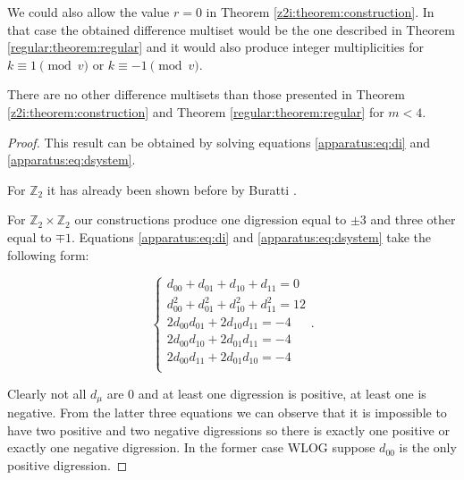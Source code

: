 \begin{remark}
    We could also allow the value $r=0$ in Theorem \ref{z2i:theorem:construction}. In that case the obtained difference multiset would be the one described in 
Theorem \ref{regular:theorem:regular} and it would also produce  integer multiplicities for $k \equiv 1 \pmod v$ or $k \equiv -1 \pmod v$.
\end{remark}

\begin{theorem}
	\label{z2i:theorem:exclusive}
    There are no other difference multisets than those presented in Theorem \ref{z2i:theorem:construction} and Theorem \ref{regular:theorem:regular} for $m < 4$.
\end{theorem}

\begin{proof}
    This result can be obtained by solving equations \eqref{apparatus:eq:di} and \eqref{apparatus:eq:dsystem}.
    
    For $\mathbb Z_2$ it has already been shown before by Buratti \cite{buratti1999old}.
    
    For $\mathbb Z_2 \times \mathbb Z_2$ our constructions produce one digression equal to $\pm 3$ and three other equal to $\mp 1$. Equations \eqref{apparatus:eq:di} and \eqref{apparatus:eq:dsystem} take the following form:
    
    \begin{equation}
        \label{z2i:eq:z2z2}
        \begin{cases}
            d_{00} + d_{01} + d_{10} + d_{11} = 0 \\
            d_{00}^2 + d_{01}^2 + d_{10}^2 + d_{11}^2 = 12 \\
            2 d_{00}d_{01} + 2 d_{10}d_{11} = -4 \\
            2 d_{00}d_{10} + 2 d_{01}d_{11} = -4 \\
            2 d_{00}d_{11} + 2 d_{01}d_{10} = -4 \\
        \end{cases}.
    \end{equation}
    
    Clearly not all $d_\mu$ are $0$ and at least one digression is positive, at least one is negative. From the latter three equations we can observe that it is impossible to have two positive and two negative digressions so there is exactly one positive or exactly one negative digression. In the former case WLOG suppose $d_{00}$ is the only positive digression.
    

\end{proof}
